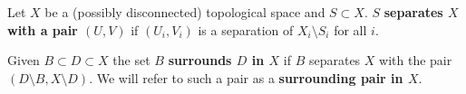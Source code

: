 \documentclass[12pt]{article}
\begin{document}
%
%

\begin{definition}
  Let $X$ be a (possibly disconnected) topological space and $S\subset X$.
  $S$ \textbf{separates $X$ with a pair $(U, V)$} if $(U_i, V_i)$ is a separation of $X_i\setminus S_i$ for all $i$.
\end{definition}

%

\begin{definition}[Surrounding]
  Given $B\subset D \subset X$ the set $B$ \textbf{surrounds $D$ in $X$} if $B$ separates $X$ with the pair $(D\setminus B, X\setminus D)$.
  We will refer to such a pair as a \textbf{surrounding pair in $X$}.
\end{definition}
\end{document}
